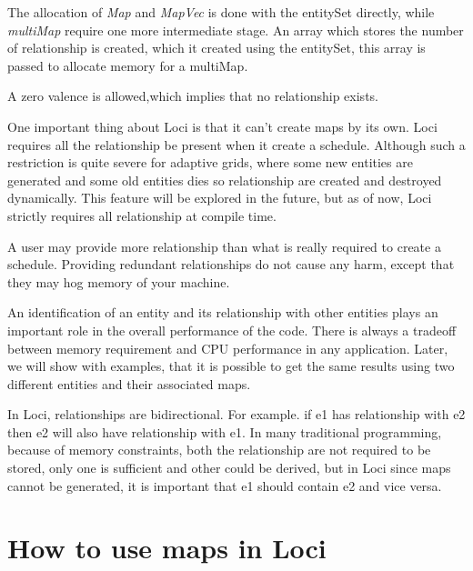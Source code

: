 \par The allocation of {\em Map} and {\em MapVec} is done with the entitySet
directly, while {\em multiMap} require one more intermediate stage. An
array which stores the number of relationship is created, which it 
created using the entitySet, this array is passed to allocate memory
for a multiMap.  
\par A zero valence is allowed,which implies that no relationship exists.
%
\par One important thing about Loci is that it can't create maps by its own.
Loci requires all the relationship be present when it create a schedule. Although
such a restriction is quite severe for adaptive grids, where some new entities
are generated and some old entities dies so relationship are created and
destroyed dynamically. This feature will be explored in the future,
but as of now, Loci strictly requires all relationship at compile time.
%
\par A user may provide more relationship than what is really required to 
create a schedule. Providing redundant relationships do not cause any harm,
except that they may hog memory of your machine. 
%
\par An identification of an entity and its relationship with other entities
plays an important role in the overall performance of the code. There is always
a tradeoff between memory requirement and CPU performance in any application.
Later, we will show with examples, that it is possible to get the same results using
two different entities and their associated maps.

\par In Loci, relationships are bidirectional.  For example. if e1 has relationship
with e2 then e2 will also have relationship with e1. In many traditional programming, 
because of memory constraints, both the relationship are not required to be stored, 
only one is sufficient and other could be derived, but in Loci since maps cannot
be generated, it is important that e1 should contain e2 and vice versa.

\section { How to use maps in Loci}

